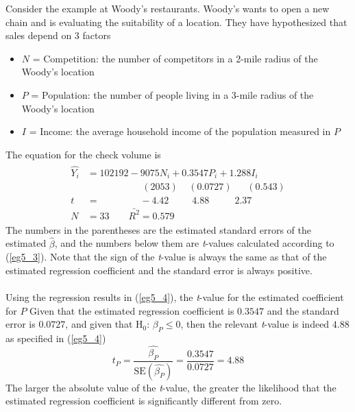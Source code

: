 \documentclass[11pt]{article}
\begin{document}
Consider the example at Woody's restaurants. Woody's wants to open a new chain and is evaluating the suitability of a location. They have hypothesized that sales depend on 3 factors
\begin{itemize}
\item $N$ = Competition: the number of competitors in a 2-mile radius of the Woody's location
\item $P$ = Population: the number of people living in a 3-mile radius of the Woody's location
\item $I$ = Income: the average household income of the population measured in $P$
\end{itemize} 
The equation for the check volume is
\begin{align}
\label{eg5_4}
\begin{split}
\hat{Y_i} &= 102192 - {9075N_i} + {0.3547P_i} + {1.288 I_i}\\
&\>\>\>\>\>\>\>\>\>\>\>\>\>\>\>\>\>\>\>\>\>\>\>\>\>\> (2053) \>\>\>\>\> (0.0727)\>\>\>\>\>\>\>(0.543)\\
t&=\>\>\>\>\>\>\>\>\>\>\>\>\>\>\>\>\>\>\> -4.42 \>\>\>\>\>\>\>\>\>\>\> 4.88\>\>\>\>\>\>\>\>\>\>\>\>2.37\\
N&=33\quad\quad\bar{R^2}=0.579
\end{split}
\end{align}
The numbers in the parentheses are the estimated standard errors of the estimated $\hat{\beta}$, and the numbers below them are \textit{t}-values calculated according to (\ref{eg5_3}). Note that the sign of the \textit{t}-value is always the same as that of the estimated regression coefficient and the standard error is always positive.\\ \\
Using the regression results in (\ref{eg5_4}), the \textit{t}-value for the estimated coefficient for $P$ Given that the estimated regression coefficient is $0.3547$ and the standard error is $0.0727$, and given that  $\text{H}_0\text{: }\beta_P \leq 0$, then the relevant \textit{t}-value is indeed $4.88$ as specified in (\ref{eg5_4})
$$
t_P = \frac{\hat{\beta_P}}{\text{SE}(\hat{\beta_P})} = \frac{0.3547}{0.0727} = 4.88
$$
The larger the absolute value of the \textit{t}-value, the greater the likelihood that the estimated regression coefficient is significantly different from zero.
\end{document}
